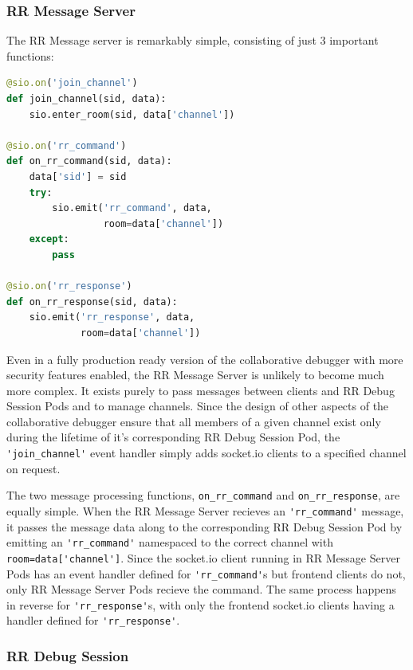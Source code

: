 \documentclass[12pt]{article}
\begin{document}
\subsubsection{RR Message Server}

The RR Message server is remarkably simple, consisting of just 3
important functions:\\

\begin{lstlisting}[language=Python,basicstyle=\linespread{0.5}\ttfamily,caption={RR Message Server},captionpos=b]
@sio.on('join_channel')
def join_channel(sid, data):
    sio.enter_room(sid, data['channel'])

@sio.on('rr_command')
def on_rr_command(sid, data):
    data['sid'] = sid
    try:
        sio.emit('rr_command', data,
                 room=data['channel'])
    except:
        pass

@sio.on('rr_response')
def on_rr_response(sid, data):
    sio.emit('rr_response', data,
             room=data['channel'])
\end{lstlisting}

Even in a fully production ready version of the collaborative debugger
with more security features enabled, the RR Message Server is unlikely
to become much more complex.  It exists purely to pass messages
between clients and RR Debug Session Pods and to manage channels.
Since the design of other aspects of the collaborative debugger ensure
that all members of a given channel exist only during the lifetime of
it's corresponding RR Debug Session Pod, the
\lstinline{'join_channel'} event handler simply adds socket.io clients
to a specified channel on request.
\par

The two message processing functions, \lstinline{on_rr_command} and
\lstinline{on_rr_response}, are equally simple.  When the RR Message
Server recieves an \lstinline{'rr_command'} message, it passes the
message data along to the corresponding RR Debug Session Pod by
emitting an \lstinline{'rr_command'} namespaced to the correct channel
with \lstinline{room=data['channel']}.  Since the socket.io client
running in RR Message Server Pods has an event handler defined for
\lstinline{'rr_command'}s but frontend clients do not, only RR Message
Server Pods recieve the command.  The same process happens in reverse
for \lstinline{'rr_response'}s, with only the frontend socket.io
clients having a handler defined for \lstinline{'rr_response'}.


\subsubsection{RR Debug Session}
\end{document}
